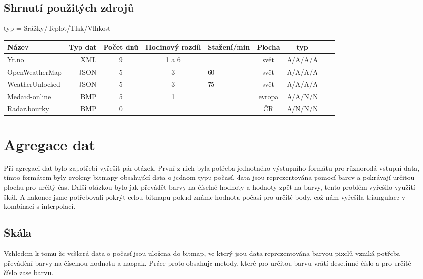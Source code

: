 \documentclass[czech,bachelor,dept460,male,csharp,cpdeclaration]{diploma}
\begin{document}
	\subsection{Shrnutí použitých zdrojů}
	
	typ = Srážky/Teplot/Tlak/Vlhkost
	
	\begin{center}
		\begin{tabular} {l r c c l c c c c}
			
			Název & Typ dat & Počet dnů & Hodinový rozdíl & Stažení/min & Plocha & typ \\
			\hline
			Yr.no & XML & 9 & 1 a 6 & & svět & A/A/A/A \\ 
			OpenWeatherMap & JSON & 5 & 3 & 60 & svět & A/A/A/A \\ 
			WeatherUnlocked & JSON & 5 & 3 & 75 & svět & A/A/A/A \\ 
			Medard-online & BMP & 5 & 1 &  & evropa & A/A/N/N \\ 
			Radar.bourky & BMP & 0 & & & ČR & A/N/N/N \\ 
			
		\end{tabular}
	\end{center}
	
	\section{Agregace dat}
	
	Při agregaci dat bylo zapotřebí vyřešit pár otázek. První z nich byla potřeba jednotného výstupního formátu pro různorodá vstupní data, tímto formátem byly zvoleny bitmapy obsahující data o jednom typu počasí, data jsou reprezentována pomocí barev a pokrávají určitou plochu pro určitý čas. Další otázkou bylo jak převádět barvy na číselné hodnoty a hodnoty zpět na barvy, tento problém vyřešilo využití škál. A nakonec jsme potřebovali pokrýt celou bitmapu pokud známe hodnotu počasí pro určíté body, což nám vyřešila triangulace v kombinaci s interpolací.
	
	\subsection{Škála}
	
	Vzhledem k tomu že veškerá data o počasí jsou uložena do bitmap, ve který jsou data reprezentována barvou pixelů vzniká potřeba převádění barvy na číselnou hodnotu a naopak. Práce proto obsahuje metody, které pro určitou barvu vrátí desetinné číslo a pro určité číslo zase barvu.
	
\end{document}
